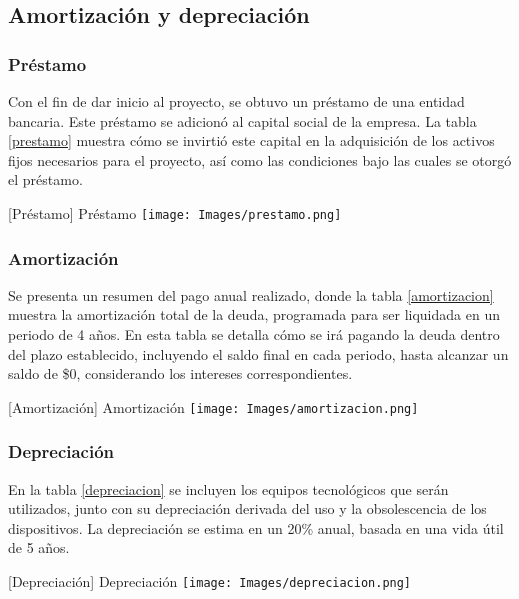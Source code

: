 \subsection{Amortización y depreciación}

\subsubsection{Préstamo}

Con el fin de dar inicio al proyecto, se obtuvo un préstamo de una entidad bancaria. Este préstamo se adicionó al capital social de la empresa. La tabla \ref{prestamo} muestra cómo se invirtió este capital en la adquisición de los activos fijos necesarios para el proyecto, así como las condiciones bajo las cuales se otorgó el préstamo.

\vspace{2mm}
\begin{minipage}{0.9\textwidth}
\centering
{}[{Préstamo}]{ Préstamo }
\label{prestamo}
\texttt{[image: Images/prestamo.png]}
\end{minipage}

\subsubsection{Amortización}


Se presenta un resumen del pago anual realizado, donde la tabla \ref{amortizacion} muestra la amortización total de la deuda, programada para ser liquidada en un periodo de 4 años. En esta tabla se detalla cómo se irá pagando la deuda dentro del plazo establecido, incluyendo el saldo final en cada periodo, hasta alcanzar un saldo de \$0, considerando los intereses correspondientes.

\vspace{2mm}
\begin{minipage}{0.9\textwidth}
\centering
{}[{Amortización}]{ Amortización }
\label{amortizacion}
\texttt{[image: Images/amortizacion.png]}
\end{minipage}


\subsubsection{Depreciación}

En la tabla \ref{depreciacion} se incluyen los equipos tecnológicos que serán utilizados, junto con su depreciación derivada del uso y la obsolescencia de los dispositivos. La depreciación se estima en un 20\% anual, basada en una vida útil de 5 años.


\vspace{2mm}
\begin{minipage}{0.9\textwidth}
\centering
{}[{Depreciación}]{ Depreciación }
\label{depreciacion}
\texttt{[image: Images/depreciacion.png]}
\end{minipage}